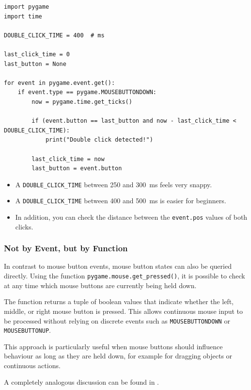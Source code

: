 \lstset{firstnumber=1}
\begin{lstlisting}
import pygame
import time

DOUBLE_CLICK_TIME = 400  # ms

last_click_time = 0
last_button = None

for event in pygame.event.get():
	if event.type == pygame.MOUSEBUTTONDOWN:
		now = pygame.time.get_ticks()

		if (event.button == last_button and now - last_click_time < DOUBLE_CLICK_TIME):
			print("Double click detected!")

		last_click_time = now
		last_button = event.button
\end{lstlisting}

\begin{hintbox}[Options]
\begin{itemize}
	\item A \texttt{DOUBLE\_CLICK\_TIME} between 250 and \SI{300}{ms} feels very snappy.
	\item A \texttt{DOUBLE\_CLICK\_TIME} between 400 and \SI{500}{ms} is easier for beginners.
	\item In addition, you can check the distance between the \texttt{event.pos} values of both clicks.
\end{itemize}
\end{hintbox}

\subsubsection{Not by Event, but by Function}
In contrast to mouse button events, mouse button states can also be queried directly. Using the function \texttt{pygame.mouse.get\_pressed()}, it is possible to check at any time which mouse buttons are currently being held down.

The function returns a tuple of boolean values that indicate whether the left, middle, or right mouse button is pressed. This allows continuous mouse input to be processed without relying on discrete events such as \texttt{MOUSEBUTTONDOWN} or \texttt{MOUSEBUTTONUP}.

This approach is particularly useful when mouse buttons should influence behaviour as long as they are held down, for example for dragging objects or continuous actions.

A completely analogous discussion can be found in .

